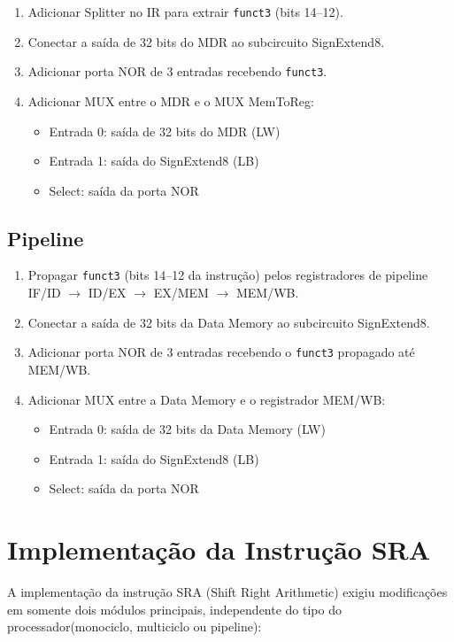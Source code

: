 \documentclass{article}
\begin{document}
\begin{enumerate}
    \item Adicionar Splitter no IR para extrair \texttt{funct3} (bits 14--12).
    \item Conectar a saída de 32 bits do MDR ao subcircuito SignExtend8.
    \item Adicionar porta NOR de 3 entradas recebendo \texttt{funct3}.
    \item Adicionar MUX entre o MDR e o MUX MemToReg:
    \begin{itemize}
        \item Entrada 0: saída de 32 bits do MDR (LW)
        \item Entrada 1: saída do SignExtend8 (LB)
        \item Select: saída da porta NOR
    \end{itemize}
\end{enumerate}

\subsection*{Pipeline}

\begin{enumerate}
    \item Propagar \texttt{funct3} (bits 14--12 da instrução) pelos registradores de pipeline IF/ID $\to$ ID/EX $\to$ EX/MEM $\to$ MEM/WB.
    \item Conectar a saída de 32 bits da Data Memory ao subcircuito SignExtend8.
    \item Adicionar porta NOR de 3 entradas recebendo o \texttt{funct3} propagado até MEM/WB.
    \item Adicionar MUX entre a Data Memory e o registrador MEM/WB:
    \begin{itemize}
        \item Entrada 0: saída de 32 bits da Data Memory (LW)
        \item Entrada 1: saída do SignExtend8 (LB)
        \item Select: saída da porta NOR
    \end{itemize}
\end{enumerate}

\section{Implementação da Instrução SRA}

A implementação da instrução SRA (Shift Right Arithmetic) exigiu modificações em somente dois módulos principais, independente do tipo do processador(monociclo, multiciclo ou pipeline):
\end{document}
